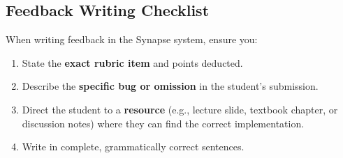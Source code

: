 \subsection{Feedback Writing Checklist}
When writing feedback in the Synapse system, ensure you:
\begin{enumerate}
    \item State the \textbf{exact rubric item} and points deducted.
    \item Describe the \textbf{specific bug or omission} in the student's submission.
    \item Direct the student to a \textbf{resource} (e.g., lecture slide, textbook chapter, or discussion notes) where they can find the correct implementation.
    \item Write in complete, grammatically correct sentences.
\end{enumerate}
